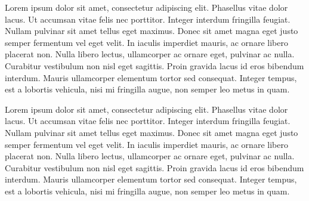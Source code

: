 {
Lorem ipsum dolor sit amet, consectetur adipiscing elit. Phasellus vitae dolor lacus. Ut accumsan vitae felis nec porttitor. Integer interdum fringilla feugiat. Nullam pulvinar sit amet tellus eget maximus. Donec sit amet magna eget justo semper fermentum vel eget velit. In iaculis imperdiet mauris, ac ornare libero placerat non. Nulla libero lectus, ullamcorper ac ornare eget, pulvinar ac nulla. Curabitur vestibulum non nisl eget sagittis. Proin gravida lacus id eros bibendum interdum. Mauris ullamcorper elementum tortor sed consequat. Integer tempus, est a lobortis vehicula, nisi mi fringilla augue, non semper leo metus in quam.

Lorem ipsum dolor sit amet, consectetur adipiscing elit. Phasellus vitae dolor lacus. Ut accumsan vitae felis nec porttitor. Integer interdum fringilla feugiat. Nullam pulvinar sit amet tellus eget maximus. Donec sit amet magna eget justo semper fermentum vel eget velit. In iaculis imperdiet mauris, ac ornare libero placerat non. Nulla libero lectus, ullamcorper ac ornare eget, pulvinar ac nulla. Curabitur vestibulum non nisl eget sagittis. Proin gravida lacus id eros bibendum interdum. Mauris ullamcorper elementum tortor sed consequat. Integer tempus, est a lobortis vehicula, nisi mi fringilla augue, non semper leo metus in quam.}

